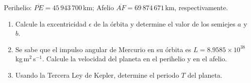 \documentclass[a4paper,12pt]{article}
\begin{document}
\begin{enumerate}
Perihelio: $\overline{PE} = 45\,943\,700$\,km; Afelio $\overline{AF} =
69\,874\,671$\,km, respectivamente.
\begin{enumerate}
\item Calcule la excentricidad $\epsilon$ de la órbita y determine el valor de
los semiejes $a$ y $b$.
\item Se sabe que el impulso angular de Mercurio en su órbita es $L = 8.9585
\times 10^{38}$\,kg\,m$^2$\,s$^{-1}$. Calcule la velocidad del planeta en el
perihelio y en el afelio.
\item Usando la Tercera Ley de Kepler, determine el periodo $T$ del planeta.
\end{enumerate}
\end{enumerate}
\end{document}
